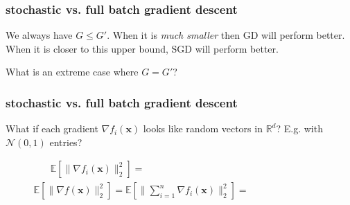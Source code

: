 \documentclass[compress]{beamer}
\newcommand{\bv}[1]{\mathbf{#1}}
\newcommand{\R}{\mathbb{R}}
\newcommand{\E}{\mathbb{E}}
\begin{document}
\begin{frame}[t]
	\frametitle{stochastic vs. full batch gradient descent}
	We always have $G \leq G'$. When it is \emph{much smaller} then GD will perform better. When it is closer to this upper bound, SGD will perform better. 
	
	\begin{center}
	What is an extreme case where $G = G'$? 
	\end{center}
\end{frame}

\begin{frame}[t]
	\frametitle{stochastic vs. full batch gradient descent}
	What if each gradient $\nabla f_i(\bv{x})$ looks like random vectors in $\R^d$? E.g. with $\mathcal{N}(0,1)$ entries? 
	
	\begin{align*}
		\E \left[\|\nabla f_i(\bv{x})\|_2^2\right] = \hspace{17em}
	\end{align*}
	\begin{align*}
		\E \left[\|\nabla f(\bv{x})\|_2^2\right] = \E \left[\|\sum_{i=1}^n\nabla f_i(\bv{x})\|_2^2\right] = \hspace{8em}
	\end{align*}

\vspace{5em}

\end{frame}
\end{document}
